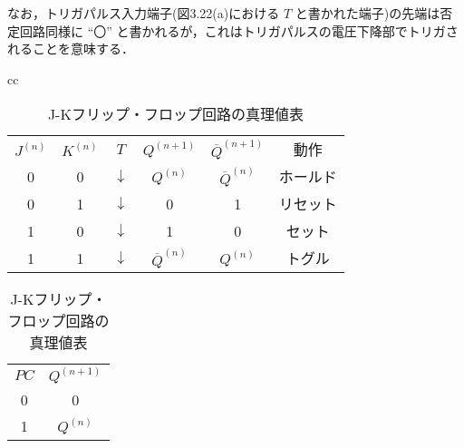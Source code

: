 なお，トリガパルス入力端子(図3.22(a)における $T$ と書かれた端子)の先端は否定回路同様に ``〇'' と書かれるが，これはトリガパルスの電圧下降部でトリガされることを意味する．

\vspace{0.5cm}

\begin{table}[!h]
    \caption{J-Kフリップ・フロップ回路の真理値表}
    \label{tbl13}
    \begin{center}
        \begin{tabular}{cc}
            \begin{minipage}{0.6\hsize}
                \begin{center}
                    \begin{tabular}{|c|c|c|c|c||c|}
                        \hline
                        $J^{(n)}$ & $K^{(n)}$ & $T$          & $Q^{(n+1)}$            & ${\overline{Q}}^{(n + 1)}$ & 動作     \\
                        \hhline{|=|=|=|=|=#=|}
                        0         & 0         & $\downarrow$ & $Q^{(n)}$              & $ {\overline{Q}}^{(n)}$    & ホールド \\
                        \hline
                        0         & 1         & $\downarrow$ & 0                      & 1                          & リセット \\
                        \hline
                        1         & 0         & $\downarrow$ & 1                      & 0                          & セット   \\
                        \hline
                        1         & 1         & $\downarrow$ & ${\overline{Q}}^{(n)}$ & $Q^{(n)}$                  & トグル   \\
                        \hline
                    \end{tabular}
                \end{center}
            \end{minipage}
            \begin{minipage}{0.4\hsize}
                \begin{center}
                    \begin{tabular}{|c|c|}
                        \hline
                        $PC$ & $Q^{(n + 1)}$ \\
                        \hhline{|=#=|}
                        0    & 0             \\
                        \hline
                        1    & $Q^{(n)}$     \\
                        \hline
                    \end{tabular}
                \end{center}
            \end{minipage}
        \end{tabular}
    \end{center}
\end{table}

